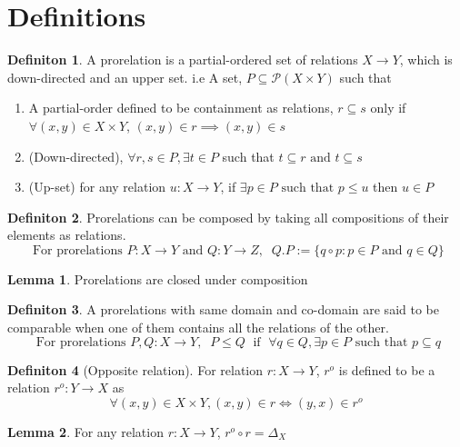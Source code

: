 \documentclass[18pt,a4paper]{article}
\theoremstyle{definition}
\newtheorem{definition}{Definiton}[section]
\newtheorem{lemma}{Lemma}[definition]
\begin{document}
\section{Definitions}%
\label{sec:definitions}

\begin{definition}%
	A prorelation is a partial-ordered set of relations $X \to Y$,
	which is down-directed and an upper set. i.e
	A set, $P \subseteq \mathcal{P}(X \times Y)$ such that
	\begin{enumerate}[label=(\roman*)]
		\item A partial-order defined to be containment as relations, $r \subseteq s$
			only if $\forall (x,y) \in X \times Y$, $(x,y) \in r \implies (x,y)\in s$
		\item (Down-directed), $\forall r,s \in P, \exists t \in P $ such that
			$t\subseteq r \text{ and } t \subseteq s$
		\item (Up-set) for any relation $u:X\to Y$, if $\exists p \in P \text{ such that } p\leq u $
			then $u \in P$
	\end{enumerate} \end{definition} %
	\begin{definition}%
		Prorelations can be composed by taking all compositions of their elements as relations.
	\[ \text{ For prorelations } P:X\to Y \text{ and } Q:Y\to Z,
	\; \; Q.P:=\{q \circ p : p \in P \text{ and } q \in Q  \} \]
	\end{definition}
	\begin{lemma}
		Prorelations are closed under composition
	\end{lemma}
	\begin{definition} %
		A prorelations with same domain and co-domain are said to be comparable
		when one of them contains all the relations of the other.
		\[ \text{ For prorelations }  P,Q:X \to Y, \;\; P \leq Q \;\text{ if }\; \forall q \in Q, \exists p \in P
		\text{ such that } p \subseteq q    \]
	\end{definition}
	\begin{definition}[Opposite relation] %
		For relation $r:X \to Y$, $r^o$ is defined to be a relation $r^o:Y \to X$ as
		\[ \forall (x,y)\in X \times Y, (x,y)\in r \iff (y,x) \in r^o \]
	\end{definition}
	\begin{lemma}
		For any relation $r:X \to Y$, $r^o \circ r = \Delta_X$
	\end{lemma}
\end{document}
